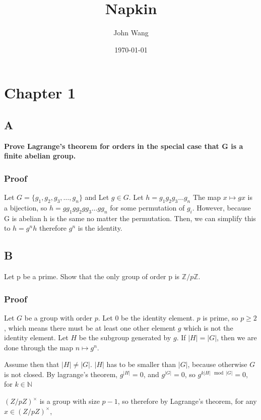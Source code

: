 \documentclass[11pt]{article}
\author{John Wang}
\date{\today}
\title{Napkin}
\begin{document}
\maketitle
\tableofcontents

\section{Chapter 1}
\label{sec:orge790473}
\subsection{A}
\label{sec:orgaa4be54}
\textbf{Prove Lagrange’s theorem for orders in the special case that G is a finite abelian group.}


\subsubsection{Proof}
\label{sec:orgab1ec7f}
Let \(G = \{g_1, g_2, g_3, \dots, g_n\}\) and
Let \(g \in G\). Let \(h = g_1g_2g_3\dots g_n\)  The map \(x \mapsto gx\) is a bijection,
so \(h = g g_1 g g_2 g g_3 \dots g g_n\) for some permutation of \(g_i\).  However,  because G is abelian
h is the same no matter the permutation.  Then, we can simplify this to
\(h = g^n h\) therefore \(g^n\) is the identity.

\subsection{B}
\label{sec:org982b6fc}
Let p be a prime. Show that the only group of order p is \(\mathbb{Z}/p \mathbb{Z}\).


\subsubsection{Proof}
\label{sec:org13a4754}
Let \(G\) be a group with order \(p\). Let \(0\) be the identity element. \(p\) is prime, so \(p \ge 2\), which means there must
be at least one other element \(g\) which is not the identity element. Let \(H\) be the subgroup
generated by \(g\). If \(|H| = |G|\), then we are done through the map \(n \mapsto g^n\).

Assume then that \(|H| \ne |G|\). \(|H|\) has to be smaller than \(|G|\), because otherwise \(G\) is not closed.
By lagrange's theorem,  \(g^{|H|} = 0\), and \(g^{|G|} = 0\), so \(g ^{k |H| \mod |G|} = 0\), for \(k \in \mathbb{N}\)


\((Z / pZ)^{\times}\) is a group with size \(p - 1\), so therefore by Lagrange's theorem, for any
\(x \in (Z / pZ)^{\times}\),
\end{document}

